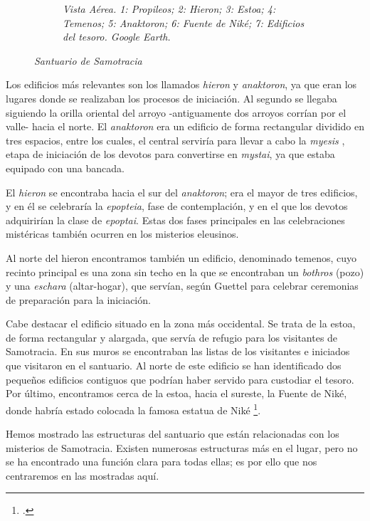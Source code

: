 \begin{figure}[h!]
\begin{subfigure}[t]{0.45\linewidth}
		\caption{\textit{Vista Aérea. 1: Propileos; 2: Hieron; 3: Estoa; 4: Temenos; 5: Anaktoron; 6: Fuente de Niké; 7: Edificios del tesoro. Google Earth.}}
		\label{fig:vista espacial-samotracia}
	\end{subfigure}
	\caption{\textit{Santuario de Samotracia}}
	\label{fig:westminster}
\end{figure}

Los edificios más relevantes son los llamados \textit{hieron} y \textit{anaktoron}, ya que eran los lugares donde se realizaban los procesos de iniciación. Al segundo se llegaba siguiendo la orilla oriental del arroyo -antiguamente dos arroyos corrían por el valle- hacia el norte. El \textit{anaktoron} era un edificio de forma rectangular dividido en tres espacios, entre los cuales, el central serviría para llevar a cabo la \textit{myesis }, etapa de iniciación de los devotos para convertirse en \textit{mystai}, ya que estaba equipado con una bancada.

El \textit{hieron} se encontraba hacia el sur del \textit{anaktoron}; era el mayor de tres edificios, y en él se celebraría la \textit{epopteia}, fase de contemplación, y en el que los devotos adquirirían la clase de \textit{epoptai}. Estas dos fases principales en las celebraciones mistéricas también ocurren en los misterios eleusinos.

Al norte del hieron encontramos también un edificio, denominado temenos, cuyo recinto principal es una zona sin techo en la que se encontraban un \textit{bothros} (pozo) y una \textit{eschara} (altar-hogar), que servían, según Guettel para celebrar ceremonias de preparación para la iniciación.

Cabe destacar el edificio situado en la zona más occidental. Se trata de la estoa, de forma rectangular y alargada, que servía de refugio para los visitantes de Samotracia. En sus muros se encontraban las listas de los visitantes e iniciados que visitaron en el santuario. Al norte de este edificio se han identificado dos pequeños edificios contiguos que podrían haber servido para custodiar el tesoro. Por último, encontramos cerca de la estoa, hacia el sureste, la Fuente de Niké, donde habría estado colocada la famosa estatua de Niké \footcite[8]{guettelcoleTheoiMegaloiCult1984}. 

Hemos mostrado las estructuras del santuario que están relacionadas con los misterios de Samotracia. Existen numerosas estructuras más en el lugar, pero no se ha encontrado una función clara para todas ellas; es por ello que nos centraremos en las mostradas aquí.
 

